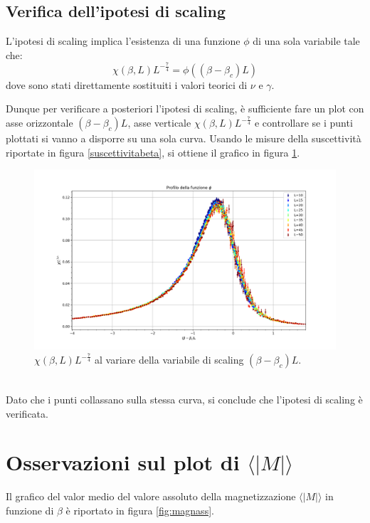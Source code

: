 \documentclass[10pt,a4paper]{article}
\begin{document}
\subsection*{Verifica dell'ipotesi di scaling}
L'ipotesi di scaling implica l'esistenza di una funzione $\phi$ di una sola variabile tale che:
\begin{equation*}
\chi(\beta,L)L^{-\frac{7}{4}}= \phi\left((\beta-\beta_c)L\right)
\end{equation*}
dove sono stati direttamente sostituiti i valori teorici di $\nu$ e $\gamma$. 

Dunque per verificare a posteriori l'ipotesi di scaling, è sufficiente fare un plot con asse orizzontale $(\beta-\beta_c)L$, asse verticale $\chi(\beta,L)L^{-\frac{7}{4}}$ e controllare se i punti plottati si vanno a disporre su una sola curva. Usando le misure della suscettività riportate in figura \ref{suscettivitabeta}, si ottiene il grafico in figura \ref{fig:suscettivitalviararedibetaeL}. %
\begin{figure}[h!]
	\centering
	\includegraphics[width=1\linewidth]{susc_norm}
	\caption{$\chi(\beta,L)L^{-\frac{7}{4}}$ al variare della variabile di scaling $(\beta-\beta_c)L$.}
	\label{fig:suscettivitalviararedibetaeL}
\end{figure}\\
Dato che i punti collassano sulla stessa curva, si conclude che l'ipotesi di scaling è verificata.
\newpage

\section{Osservazioni sul plot di $\langle|M|\rangle$}
Il grafico del valor medio del valore assoluto della magnetizzazione $\langle |M|\rangle$ in funzione di $\beta$ è riportato in figura \ref{fig:magnass}.
\end{document}
